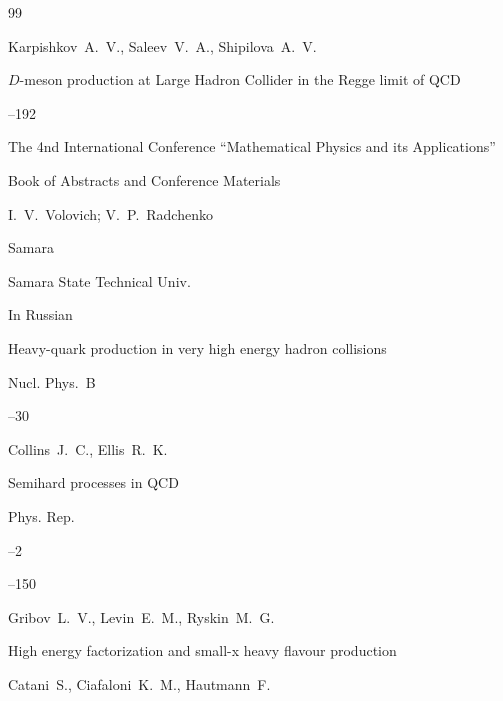 \begin{thebibliography}{99}




\by  Karpishkov~A.~V., Saleev~V.~A., Shipilova~A.~V. 

\paper $D$-meson production at Large Hadron Collider in the Regge limit of QCD

--192

\inbook  The 4nd International Conference ``Mathematical Physics and its Applications''

\bookinfo Book of Abstracts and Conference Materials

\eds I.~V.~Volovich; V.~P.~Radchenko

\publaddr Samara

\publ Samara State Technical Univ.


\lang In Russian






\paper Heavy-quark production in very high energy hadron collisions


\jour Nucl. Phys.~B 



--30

\by Collins~J.~C., Ellis~R.~K.





\paper Semihard processes in QCD


\jour Phys. Rep.


--2

--150


\by  Gribov~L.~V., Levin~E.~M., Ryskin~M.~G.






\paper High energy factorization and small-x heavy flavour production

\by Catani~S., Ciafaloni~K.~M., Hautmann~F.


\end{thebibliography}
